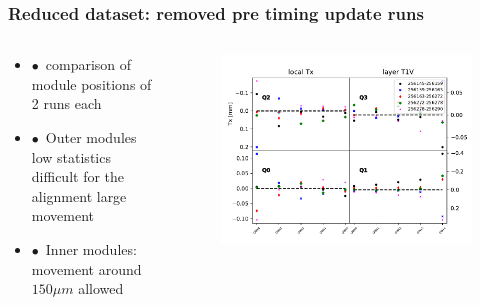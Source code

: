\documentclass[aspectratio=1610, 12pt, xcolor=dvipsnames]{beamer}
\begin{document}
\begin{frame}\frametitle{Reduced dataset: removed pre timing update runs}
  \begin{columns}
    \begin{column}[c]{0.48\textwidth}
      \begin{itemize}
        \item $\bullet$\, comparison of module positions of 2 runs each
        \item $\bullet$\, Outer modules \to low statistics \to difficult for the alignment \to large movement
        \item $\bullet$\, Inner modules: movement around $150 \mu m$ allowed
      \end{itemize}
    \end{column}
      \begin{column}[c]{0.48\textwidth}
        \begin{figure}
          \includegraphics[width=\textwidth]{plots/stability_plots/diff_reduced_Tx_T1V_Tx.pdf}
        \end{figure}
      \end{column}
  \end{columns}
\end{frame}
\end{document}
